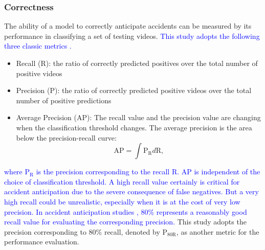 \documentclass[journal]{IEEEtran}
\begin{document}
\subsubsection{Correctness}
The ability of a model to correctly anticipate accidents can be measured by its performance in classifying a set of testing videos. \textcolor{blue}{This study adopts the following three classic metrics \cite{goodfellow2016deep}.} 
\begin{itemize}
    \item Recall (R): the ratio of correctly predicted positives over the total number of positive videos
\item Precision (P): the ratio of correctly predicted positive videos over the total number of positive predictions
\item Average Precision (AP): The recall value and the precision value are changing when the classification threshold changes. The average precision is the area below the precision-recall curve: 
    \begin{equation}
        \text{AP}=\int \text{P}_{\text{R}}d\text{R},
    \end{equation}
\end{itemize}
\textcolor{blue}{where $\text{P}_{\text{R}}$ is the precision corresponding to the recall R. AP is independent of the choice of classification threshold.
}
\textcolor{blue}{A high recall value certainly is critical for accident anticipation due to the severe consequence of false negatives. But a very high recall could be unrealistic, especially when it is at the cost of very low precision. In accident anticipation studies \cite{chan2016anticipating,bao2020uncertainty}, 80\%  represents a reasonably good recall value for evaluating the corresponding precision.} This study adopts the precision corresponding to 80\% recall, denoted by P$_{80\text{R}}$, as another metric for the performance evaluation.
\end{document}
